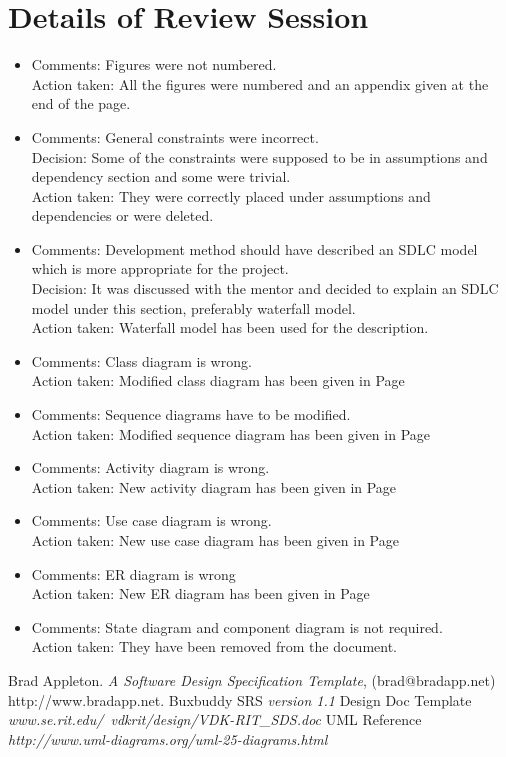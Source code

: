 \documentclass[a4paper,12pt]{article}
\begin{document}
\section{Details of Review Session}
\begin{itemize}
\item Comments: Figures were not numbered.\\
Action taken: All the figures were numbered and an appendix given at the end of the page.
\item Comments: General constraints were incorrect.\\
Decision: Some of the constraints were supposed to be in assumptions and dependency section and some were trivial.\\
Action taken: They were correctly placed under assumptions and dependencies or were deleted.
\item Comments: Development method should have described an SDLC model which is more appropriate for the project.\\
Decision: It was discussed with the mentor and decided to explain an SDLC model under this section, preferably waterfall model.\\
Action taken: Waterfall model has been used for the description.
\item Comments: Class diagram is wrong.\\
Action taken: Modified class diagram has been given in Page
\item Comments: Sequence diagrams have to be modified.\\
Action taken: Modified sequence diagram has been given in Page
\item Comments: Activity diagram is wrong.\\
Action taken: New activity diagram has been given in Page
\item Comments: Use case diagram is wrong.\\
Action taken: New use case diagram has been given in Page
\item Comments: ER diagram is wrong\\
Action taken: New ER diagram has been given in Page
\item Comments: State diagram and component diagram is not required.\\
Action taken: They have been removed from the document.
\end{itemize}
\begin{thebibliography}{}
Brad Appleton. \textit{A Software Design Specification Template}, (brad@bradapp.net)   http://www.bradapp.net.
Buxbuddy SRS  \textit{version 1.1}
Design Doc Template  \textit{www.se.rit.edu/~vdkrit/design/VDK-RIT\_SDS.doc}
UML Reference  \textit{http://www.uml-diagrams.org/uml-25-diagrams.html }
\end{thebibliography}{}
\end{document}
